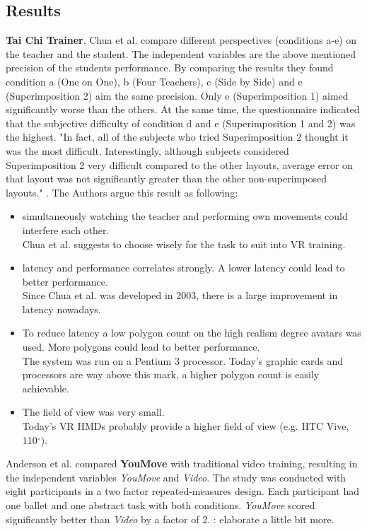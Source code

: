\subsection{Results}
\textbf{Tai Chi Trainer}. Chua et al. compare different perspectives (conditions a-e) on the teacher and the student. The independent variables are the above mentioned precision of the students performance. By comparing the results they found condition a (One on One), b (Four Teachers), c (Side by Side) and e (Superimposition 2) aim the same precision. Only e (Superimposition 1) aimed significantly worse than the others. At the same time, the questionnaire indicated that the subjective difficulty of condition d and e (Superimposition 1 and 2) was the highest. "In fact, all of the subjects who tried Superimposition 2 thought it was the most difficult. Interestingly, although subjects considered Superimposition 2 very difficult compared to the other layouts, average error on that layout was not significantly greater than the other non-superimposed layouts." \cite{Chua2003}. The Authors argue this result as following:
\begin{itemize}
	\item simultaneously watching the teacher and performing own movements could interfere each other.\\
	Chua et al. suggests to choose wisely for the task to suit into VR training.
	\item latency and performance correlates strongly. A lower latency could lead to better performance.\\
	Since Chua et al. \cite{Chua2003} was developed in 2003, there is a large improvement in latency nowadays.
	\item To reduce latency a low polygon count on the high realism degree avatars was used. More polygons could lead to better performance.\\
	The system was run on a Pentium 3 processor. Today's graphic cards and processors are way above this mark, a higher polygon count is easily achievable.
	\item The field of view was very small.\\
	Today's VR HMDs probably provide a higher field of view (e.g. HTC Vive, 110$^\circ$).
\end{itemize}
Anderson et al. compared \textbf{YouMove} with traditional video training, resulting in the independent variables \textit{YouMove} and \textit{Video}. The study was conducted with eight participants in a two factor repeated-measures design. Each participant had one ballet and one abstract task with both conditions. \textit{YouMove} scored significantly better than \textit{Video} by a factor of 2. \todo: elaborate a little bit more.\\ \\
